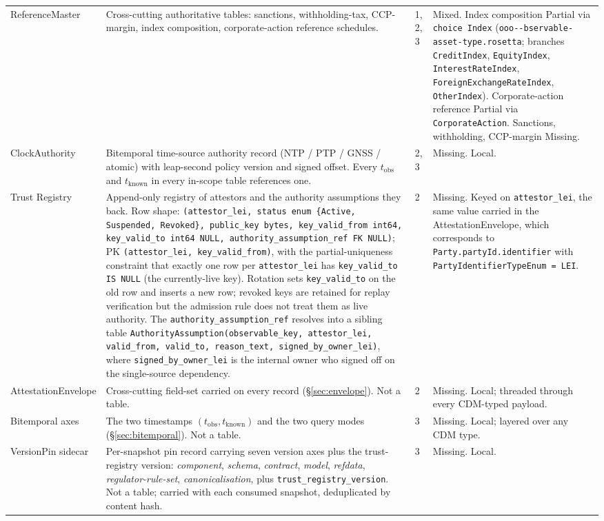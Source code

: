 \documentclass[11pt,a4paper]{article}
\makeatletter
\newcounter{rul}
\def\rfile#1{\texttt{\@rfile #1\relax}}
\def\@rfile#1{\ifx#1\relax\else#1\ifx#1-\penalty100\fi\expandafter\@rfile\fi}
\makeatother
\begin{document}
\begin{footnotesize}
\begin{longtable}{@{}>{\raggedright\arraybackslash}p{2.4cm}p{5.7cm}p{0.7cm}p{6.7cm}@{}}
Reference\-Master & Cross-cutting authoritative tables: sanctions, withholding-tax, CCP-margin, index composition, corporate-action reference schedules. & 1, 2, 3 & Mixed. Index composition Partial via \texttt{choice Index} (\rfile{observable-asset-type.rosetta}; branches \texttt{CreditIndex}, \texttt{EquityIndex}, \texttt{InterestRateIndex}, \texttt{ForeignExchangeRateIndex}, \texttt{OtherIndex}). Corporate-action reference Partial via \texttt{CorporateAction}. Sanctions, withholding, CCP-margin Missing. \\
Clock\-Authority & Bitemporal time-source authority record (NTP / PTP / GNSS / atomic) with leap-second policy version and signed offset. Every $t_{\text{obs}}$ and $t_{\text{known}}$ in every in-scope table references one. & 2, 3 & Missing. Local. \\
Trust Registry & Append-only registry of attestors and the authority assumptions they back. Row shape: \texttt{(attestor\_lei, status enum \{Active, Suspended, Revoked\}, public\_key bytes, key\_valid\_from int64, key\_valid\_to int64 NULL, authority\_assumption\_ref FK NULL)}; PK \texttt{(attestor\_lei, key\_valid\_from)}, with the partial-uniqueness constraint that exactly one row per \texttt{attestor\_lei} has \texttt{key\_valid\_to IS NULL} (the currently-live key). Rotation sets \texttt{key\_valid\_to} on the old row and inserts a new row; revoked keys are retained for replay verification but the admission rule does not treat them as live authority. The \texttt{authority\_assumption\_ref} resolves into a sibling table \texttt{AuthorityAssumption(observable\_key, attestor\_lei, valid\_from, valid\_to, reason\_text, signed\_by\_owner\_lei)}, where \texttt{signed\_by\_owner\_lei} is the internal owner who signed off on the single-source dependency. & 2 & Missing. Keyed on \texttt{attestor\_lei}, the same value carried in the AttestationEnvelope, which corresponds to \texttt{Party.partyId.identifier} with \texttt{PartyIdentifierTypeEnum = LEI}. \\
Attestation\-Envelope & Cross-cutting field-set carried on every record (\S\ref{sec:envelope}). Not a table. & 2 & Missing. Local; threaded through every CDM-typed payload. \\
Bitemporal axes & The two timestamps $(t_{\text{obs}}, t_{\text{known}})$ and the two query modes (\S\ref{sec:bitemporal}). Not a table. & 3 & Missing. Local; layered over any CDM type. \\
Version\-Pin sidecar & Per-snapshot pin record carrying seven version axes plus the trust-registry version: \emph{component}, \emph{schema}, \emph{contract}, \emph{model}, \emph{refdata}, \emph{regulator-rule-set}, \emph{canonicalisation}, plus \texttt{trust\_registry\_version}. Not a table; carried with each consumed snapshot, deduplicated by content hash. & 3 & Missing. Local. \\
\end{longtable}
\end{footnotesize}
\end{document}
